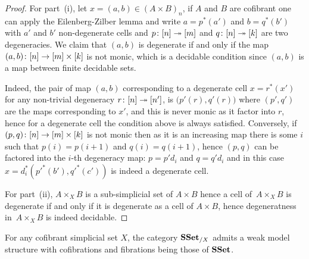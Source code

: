 \documentclass[reqno,10pt,a4paper,oneside,draft]{amsart}
\begin{document}
\begin{proof} For part~(i), let $x = (a,b) \in (A \times B)_n$, if $A$ and $B$ are cofibrant one can apply the Eilenberg-Zilber lemma and write $a = p^*(a')$ and $b = q^*(b')$ with $a'$ and $b'$ non-degenerate cells and $p \colon [n] \twoheadrightarrow [m]$ and $q \colon [n] \twoheadrightarrow [k]$ are two degeneracies. We claim that $(a,b)$ is degenerate if and only if the map $(a ,b )  \colon [n] \rightarrow [m] \times [k]$ is not monic, which is a decidable condition since $(a,b)$ is a map between finite decidable sets.

Indeed, the pair of map $(a,b)$ corresponding to a degenerate cell $x=r^*(x')$ for any non-trivial degeneracy $r \colon [n] \twoheadrightarrow [n']$, is  $\big( p'(r),q'(r) \big)$ where $(p',q')$ are the maps corresponding to $x'$, and this is never monic as it factor into $r$, hence for a degenerate cell the condition above is always satisfied. Conversely, if $(p,q)\colon [n] \rightarrow [m] \times [k]$ is not monic then as it is an increasing map there is some $i$ such that $p(i)=p(i+1)$ and $q(i)=q(i+1)$, hence $(p,q)$ can be factored into the $i$-th degeneracy map: $p=p' d_i$ and $q=q' d_i$ and in this case $x= d_i^* (p'^*(b'),q'^*(c'))$ is indeed a degenerate cell.


For part~(ii), $A \times_X B$ is a sub-simplicial set of $A \times B$ hence a cell of~$A \times_X B$ is degenerate if and only if it is degenerate as a cell of $A \times B$, hence degeneratness 
in~$A \times_X B$ is indeed decidable. 
\end{proof}



\begin{proposition}
For any cofibrant simplicial set $X$, the category $\mathbf{SSet}_{/X}$ admits a weak model structure with cofibrations and fibrations  being those of $\mathbf{SSet}$.
\end{proposition}
\end{document}
